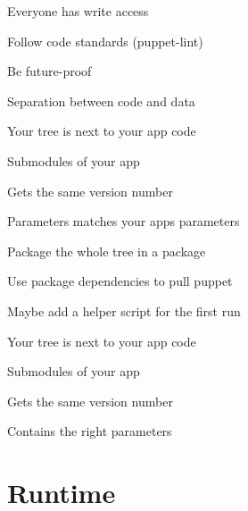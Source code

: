 \begin{iframe}
\item Everyone has write access
\item Follow code standards (puppet-lint)
\item Be future-proof
\item Separation between code and data
\end{iframe}

\begin{iframe}
\item Your tree is next to your app code
\item Submodules of your app
\item Gets the same version number
\item Parameters matches your apps parameters
\end{iframe}

\begin{iframe}
\item Package the whole tree in a package
\item Use package dependencies to pull puppet
\item Maybe add a helper script for the first run
\end{iframe}

\begin{iframe}
\item Your tree is next to your app code
\item Submodules of your app
\item Gets the same version number
\item Contains the right parameters
\end{iframe}


\section{Runtime}

